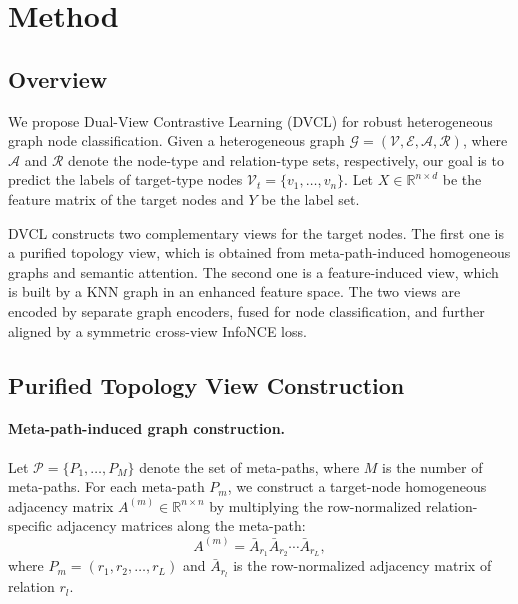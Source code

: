 ﻿\section{Method}

\subsection{Overview}

We propose Dual-View Contrastive Learning (DVCL) for robust heterogeneous graph node classification. Given a heterogeneous graph
$\mathcal{G}=(\mathcal{V},\mathcal{E},\mathcal{A},\mathcal{R})$, where $\mathcal{A}$ and $\mathcal{R}$ denote the node-type and relation-type sets, respectively, our goal is to predict the labels of target-type nodes $\mathcal{V}_t=\{v_1,\ldots,v_n\}$. Let $X\in\mathbb{R}^{n\times d}$ be the feature matrix of the target nodes and $Y$ be the label set.

DVCL constructs two complementary views for the target nodes. The first one is a purified topology view, which is obtained from meta-path-induced homogeneous graphs and semantic attention. The second one is a feature-induced view, which is built by a KNN graph in an enhanced feature space. The two views are encoded by separate graph encoders, fused for node classification, and further aligned by a symmetric cross-view InfoNCE loss.

\subsection{Purified Topology View Construction}

\paragraph{Meta-path-induced graph construction.}
Let $\mathcal{P}=\{P_1,\ldots,P_M\}$ denote the set of meta-paths, where $M$ is the number of meta-paths. For each meta-path $P_m$, we construct a target-node homogeneous adjacency matrix $A^{(m)}\in\mathbb{R}^{n\times n}$ by multiplying the row-normalized relation-specific adjacency matrices along the meta-path:
\begin{equation}
A^{(m)}
=
\bar{A}_{r_1}\bar{A}_{r_2}\cdots \bar{A}_{r_L},
\end{equation}
where $P_m=(r_1,r_2,\ldots,r_L)$ and $\bar{A}_{r_l}$ is the row-normalized adjacency matrix of relation $r_l$.

